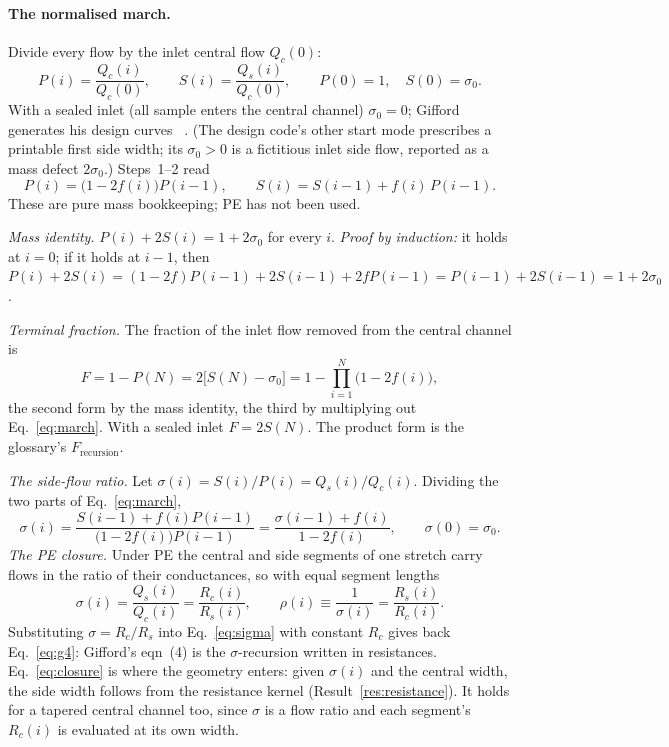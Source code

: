 \paragraph{The normalised march.} Divide every flow by the inlet central flow $Q_c(0)$:
\begin{equation}
P(i)=\frac{Q_c(i)}{Q_c(0)},\qquad S(i)=\frac{Q_s(i)}{Q_c(0)},\qquad
P(0)=1,\quad S(0)=\sigma_0 .
\end{equation}
With a sealed inlet (all sample enters the central channel) $\sigma_0=0$; Gifford generates his
design curves ~\cite[p.~4499]{b1}.
(The design code's other start mode prescribes a printable first side width; its $\sigma_0>0$
is a fictitious inlet side flow, reported as a mass defect $2\sigma_0$.) Steps~1--2 read
\begin{equation}
P(i)=\big(1-2f(i)\big)P(i-1),\qquad S(i)=S(i-1)+f(i)\,P(i-1).
\label{eq:march}
\end{equation}
These are pure mass bookkeeping; PE has not been used.

\emph{Mass identity.} $P(i)+2S(i)=1+2\sigma_0$ for every $i$. \emph{Proof by induction:} it
holds at $i=0$; if it holds at $i-1$, then
$P(i)+2S(i)=(1-2f)P(i-1)+2S(i-1)+2fP(i-1)=P(i-1)+2S(i-1)=1+2\sigma_0$.

\emph{Terminal fraction.} The fraction of the inlet flow removed from the central channel is
\begin{equation}
F = 1-P(N) = 2\big[S(N)-\sigma_0\big] = 1-\prod_{i=1}^{N}\big(1-2f(i)\big),
\label{eq:Frec}
\end{equation}
the second form by the mass identity, the third by multiplying out Eq.~\eqref{eq:march}. With a
sealed inlet $F=2S(N)$. The product form is the glossary's $F_{\mathrm{recursion}}$.

\emph{The side-flow ratio.} Let $\sigma(i)=S(i)/P(i)=Q_s(i)/Q_c(i)$. Dividing the two parts of
Eq.~\eqref{eq:march},
\begin{equation}
\sigma(i)=\frac{S(i-1)+f(i)P(i-1)}{\big(1-2f(i)\big)P(i-1)}=\frac{\sigma(i-1)+f(i)}{1-2f(i)} ,
\qquad \sigma(0)=\sigma_0 .
\label{eq:sigma}
\end{equation}
\emph{The PE closure.} Under PE the central and side segments of one stretch carry flows in the
ratio of their conductances, so with equal segment lengths
\begin{equation}
\sigma(i)=\frac{Q_s(i)}{Q_c(i)}=\frac{R_c(i)}{R_s(i)},\qquad \rho(i)\equiv\frac{1}{\sigma(i)}=\frac{R_s(i)}{R_c(i)} .
\label{eq:closure}
\end{equation}
Substituting $\sigma=R_c/R_s$ into Eq.~\eqref{eq:sigma} with constant $R_c$ gives back
Eq.~\eqref{eq:g4}: Gifford's eqn~(4) is the $\sigma$-recursion written in resistances.
Eq.~\eqref{eq:closure} is where the geometry enters: given $\sigma(i)$ and the central width,
the side width follows from the resistance kernel (Result~\ref{res:resistance}). It holds for a
tapered central channel too, since $\sigma$ is a flow ratio and each segment's $R_c(i)$ is
evaluated at its own width.

